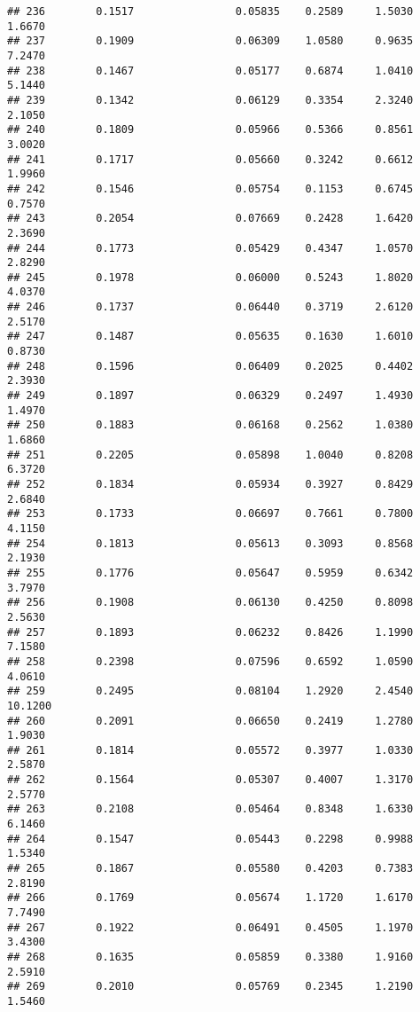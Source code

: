 \documentclass[
]{article}
\begin{document}
\begin{verbatim}
## 236        0.1517                0.05835    0.2589     1.5030       1.6670
## 237        0.1909                0.06309    1.0580     0.9635       7.2470
## 238        0.1467                0.05177    0.6874     1.0410       5.1440
## 239        0.1342                0.06129    0.3354     2.3240       2.1050
## 240        0.1809                0.05966    0.5366     0.8561       3.0020
## 241        0.1717                0.05660    0.3242     0.6612       1.9960
## 242        0.1546                0.05754    0.1153     0.6745       0.7570
## 243        0.2054                0.07669    0.2428     1.6420       2.3690
## 244        0.1773                0.05429    0.4347     1.0570       2.8290
## 245        0.1978                0.06000    0.5243     1.8020       4.0370
## 246        0.1737                0.06440    0.3719     2.6120       2.5170
## 247        0.1487                0.05635    0.1630     1.6010       0.8730
## 248        0.1596                0.06409    0.2025     0.4402       2.3930
## 249        0.1897                0.06329    0.2497     1.4930       1.4970
## 250        0.1883                0.06168    0.2562     1.0380       1.6860
## 251        0.2205                0.05898    1.0040     0.8208       6.3720
## 252        0.1834                0.05934    0.3927     0.8429       2.6840
## 253        0.1733                0.06697    0.7661     0.7800       4.1150
## 254        0.1813                0.05613    0.3093     0.8568       2.1930
## 255        0.1776                0.05647    0.5959     0.6342       3.7970
## 256        0.1908                0.06130    0.4250     0.8098       2.5630
## 257        0.1893                0.06232    0.8426     1.1990       7.1580
## 258        0.2398                0.07596    0.6592     1.0590       4.0610
## 259        0.2495                0.08104    1.2920     2.4540      10.1200
## 260        0.2091                0.06650    0.2419     1.2780       1.9030
## 261        0.1814                0.05572    0.3977     1.0330       2.5870
## 262        0.1564                0.05307    0.4007     1.3170       2.5770
## 263        0.2108                0.05464    0.8348     1.6330       6.1460
## 264        0.1547                0.05443    0.2298     0.9988       1.5340
## 265        0.1867                0.05580    0.4203     0.7383       2.8190
## 266        0.1769                0.05674    1.1720     1.6170       7.7490
## 267        0.1922                0.06491    0.4505     1.1970       3.4300
## 268        0.1635                0.05859    0.3380     1.9160       2.5910
## 269        0.2010                0.05769    0.2345     1.2190       1.5460

\end{verbatim}
\end{document}
